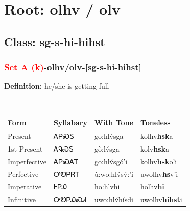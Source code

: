 \needspace{4in}
\section*{Root: olhv / olv}
\nopagebreak
{}
\needspace{3in}
\subsection*{Class: sg-s-hi-hihst}
\nopagebreak
\needspace{2in}
\subsubsection*{\textcolor{Red}{Set A (k)}{-}\textbf{olhv/olv}{-}[sg-s-hi-hihst]}
\nopagebreak
\textbf{Definition: } he/she is getting full
\\[0.5em]
\begin{tabularx}{\textwidth}{l X X X}%
\toprule%
\textbf{Form}&\textbf{Syllabary}&\textbf{With Tone}&\textbf{Toneless}\\%
\midrule%
Present&ᎪᏢᏍᎦ&go:hlv́sga&kolhv\textbf{hsk}a\\%
1st Present&ᎪᎸᏍᎦ&gò:lv́sga&kolv\textbf{hsk}a\\%
Imperfective&ᎪᏢᏍᎪᎢ&go:hlv́sgó’i&kolhv\textbf{hsk}o'i\\%
Perfective&ᎤᏬᏢᏒᎢ&ù:wo:hlv́sv́:’i&uwolhv\textbf{hs}v'i\\%
Imperative&ᎰᏢᎯ&ho:hlvhi&holhv\textbf{hi}\\%
Infinitive&ᎤᏬᏢᎯᏍᏗ&uwo:hlv́hísdi&uwolhv\textbf{hihst}i\\%
\bottomrule%
\end{tabularx}
\\[1em]